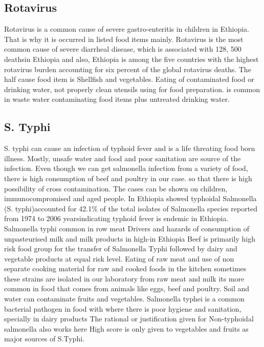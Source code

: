 \documentclass[
  letterpaper,
  DIV=11,
  numbers=noendperiod]{scrartcl}
\begin{document}
\subsection*{Rotavirus}\label{rotavirus-1}

Rotavirus is a common cause of severe gastro-enteritis in children in
Ethiopia. That is why it is occurred in listed food items mainly.
Rotavirus is the most common cause of severe diarrheal disease, which is
associated with 128, 500 deathsin Ethiopia and also, Ethiopia is among
the five countries with the highest rotavirus burden accounting for six
percent of the global rotavirus deaths. The half cause food item is
Shellfish and vegetables. Eating of contaminated food or drinking water,
not properly clean utensils using for food preparation. is common in
waste water contaminating food items plus untreated drinking water.

\subsection*{S. Typhi}\label{s.-typhi}

S. typhi can cause an infection of typhoid fever and is a life threating
food born illness. Mostly, unsafe water and food and poor sanitation are
source of the infection. Even though we can get salmonella infection
from a variety of food, there is high consumption of beef and poultry in
our case. so that there is high possibility of cross contamination. The
cases can be shown on children, immunocompromised and aged people. In
Ethiopia showed typhoidal Salmonella (S. typhi)accounted for 42.1\% of
the total isolates of Salmonella species reported from 1974 to 2006
yearsindicating typhoid fever is endemic in Ethiopia. Salmonella typhi
common in row meat Drivers and hazards of consumption of unpasteurised
milk and milk products in high-in Ethiopia Beef is primarily high risk
food group for the transfer of Salmonella Typhi followed by dairy and
vegetable products at equal risk level. Eating of raw meat and use of
non separate cooking material for raw and cooked foods in the kitchen
sometimes these strains are isolated in our laboratory from raw meat and
milk its more common in food that comes from animals like eggs, beef and
poultry. Soil and water can contaminate fruits and vegetables.
Salmonella typhei is a common bacterial pathogen in food with where
there is poor hygiene and sanitation, specially in dairy products The
rational or justification given for Non-typhoidal salmonella also works
here High score is only given to vegetables and fruits as major sources
of S.Typhi.
\end{document}
